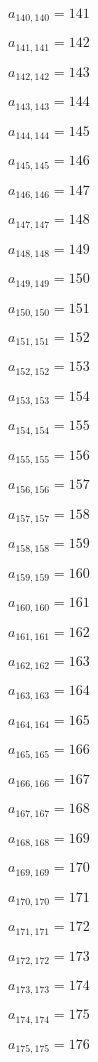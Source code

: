 \documentclass[a4paper,12pt]{article}
\begin{document}
$a _{ 140, 140 } = 141$

$a _{ 141, 141 } = 142$

$a _{ 142, 142 } = 143$

$a _{ 143, 143 } = 144$

$a _{ 144, 144 } = 145$

$a _{ 145, 145 } = 146$

$a _{ 146, 146 } = 147$

$a _{ 147, 147 } = 148$

$a _{ 148, 148 } = 149$

$a _{ 149, 149 } = 150$

$a _{ 150, 150 } = 151$

$a _{ 151, 151 } = 152$

$a _{ 152, 152 } = 153$

$a _{ 153, 153 } = 154$

$a _{ 154, 154 } = 155$

$a _{ 155, 155 } = 156$

$a _{ 156, 156 } = 157$

$a _{ 157, 157 } = 158$

$a _{ 158, 158 } = 159$

$a _{ 159, 159 } = 160$

$a _{ 160, 160 } = 161$

$a _{ 161, 161 } = 162$

$a _{ 162, 162 } = 163$

$a _{ 163, 163 } = 164$

$a _{ 164, 164 } = 165$

$a _{ 165, 165 } = 166$

$a _{ 166, 166 } = 167$

$a _{ 167, 167 } = 168$

$a _{ 168, 168 } = 169$

$a _{ 169, 169 } = 170$

$a _{ 170, 170 } = 171$

$a _{ 171, 171 } = 172$

$a _{ 172, 172 } = 173$

$a _{ 173, 173 } = 174$

$a _{ 174, 174 } = 175$

$a _{ 175, 175 } = 176$
\end{document}
